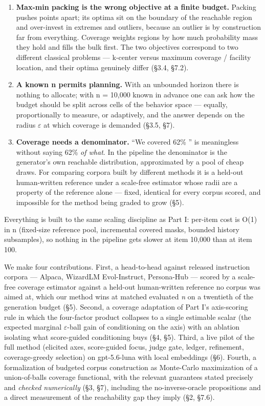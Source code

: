 \documentclass[11pt]{article}
\theoremstyle{plain}
\theoremstyle{definition}
\begin{document}
\begin{enumerate}
  \item \textbf{Max-min packing is the wrong objective at a finite budget.} Packing pushes points apart; its optima sit on the boundary of the reachable region and over-invest in extremes and outliers, because an outlier is by construction far from everything. Coverage weights regions by how much probability mass they hold and fills the bulk first. The two objectives correspond to two different classical problems --- k-center versus maximum coverage / facility location, and their optima genuinely differ (\S{}3.4, \S{}7.2).
  \item \textbf{A known n permits planning.} With an unbounded horizon there is nothing to allocate; with n = 10,000 known in advance one can ask how the budget should be split across cells of the behavior space --- equally, proportionally to measure, or adaptively, and the answer depends on the radius $\varepsilon$ at which coverage is demanded (\S{}3.5, \S{}7).
  \item \textbf{Coverage needs a denominator.} ``We covered 62\% '' is meaningless without saying 62\% \emph{of what}. In the pipeline the denominator is the generator's own reachable distribution, approximated by a pool of cheap draws. For comparing corpora built by different methods it is a held-out human-written reference under a scale-free estimator whose radii are a property of the reference alone --- fixed, identical for every corpus scored, and impossible for the method being graded to grow (\S{}5).
\end{enumerate}

Everything is built to the same scaling discipline as Part I: per-item cost is O(1) in n (fixed-size reference pool, incremental covered masks, bounded history subsamples), so nothing in the pipeline gets slower at item 10,000 than at item 100.

We make four contributions. First, a head-to-head against released instruction corpora --- Alpaca, WizardLM Evol-Instruct, Persona-Hub --- scored by a scale-free coverage estimator against a held-out human-written reference no corpus was aimed at, which our method wins at matched evaluated \emph{n} on a twentieth of the generation budget (\S{}5). Second, a coverage adaptation of Part I's axis-scoring rule in which the four-factor product collapses to a single estimable scalar (the expected marginal $\varepsilon$-ball gain of conditioning on the axis) with an ablation isolating what score-guided conditioning buys (\S{}4, \S{}5). Third, a live pilot of the full method (elicited axes, score-guided focus, judge gate, ledger, refinement, coverage-greedy selection) on gpt-5.6-luna with local embeddings (\S{}6). Fourth, a formalization of budgeted corpus construction as Monte-Carlo maximization of a union-of-balls coverage functional, with the relevant guarantees stated precisely and \emph{checked numerically} (\S{}3, \S{}7), including the no-inverse-oracle propositions and a direct measurement of the reachability gap they imply (\S{}2, \S{}7.6).
\end{document}
